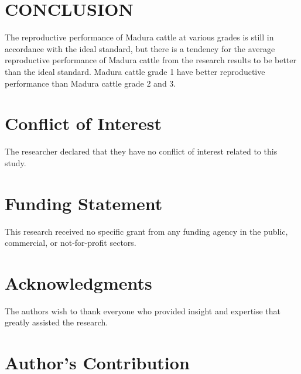 \documentclass[9pt,article,twoside]{fapet-rho-class/fapet-rho}
\begin{document}
\section{CONCLUSION}

The reproductive performance of Madura cattle at various grades is still in accordance with the ideal standard, but there is a tendency for the average reproductive performance of Madura cattle from the research results to be better than the ideal standard. Madura cattle grade 1 have better reproductive performance than Madura cattle grade 2 and 3.


\section*{Conflict of Interest}

The researcher declared that they have no conflict of interest related to this study.


\section*{Funding Statement}

This research received no specific grant from any funding agency in the public, commercial, or not-for-profit sectors.


\section*{Acknowledgments}

The authors wish to thank everyone who provided insight and expertise that greatly assisted the research.


\section*{Author's Contribution}
\end{document}
